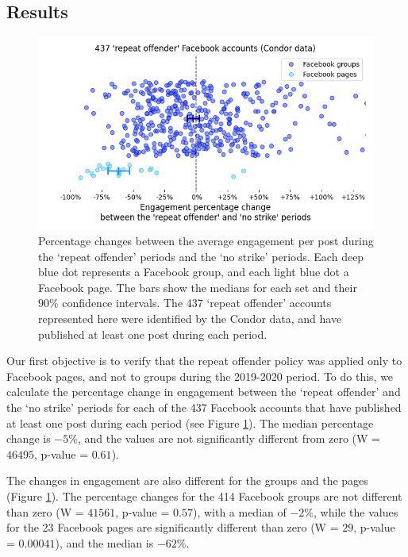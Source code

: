 \documentclass[review]{elsarticle}
\begin{document}
\subsection{Results}

\begin{figure}[!h]
\centering
\includegraphics[scale=0.5]{./../figure/condor_repeat_vs_free_percentage_change.png}
\caption{
Percentage changes between the average engagement per post during the `repeat offender' periods and the `no strike' periods.
Each deep blue dot represents a Facebook group, and each light blue dot a Facebook page.
The bars show the medians for each set and their $90\%$ confidence intervals.
The 437 `repeat offender' accounts represented here were identified by the Condor data, and have published at least one post during each period.
}
\label{condor_repeat_vs_free_percentage_change}
\end{figure}

Our first objective is to verify that the repeat offender policy was applied only to Facebook pages, and not to groups during the 2019-2020 period.
To do this, we calculate the percentage change in engagement between the `repeat offender' and the `no strike' periods for each of the 437 Facebook accounts that have published at least one post during each period (see Figure \ref{condor_repeat_vs_free_percentage_change}). 
The median percentage change is $-5\%$, and the values are not significantly different from zero (W = $46495$, p-value = $0.61$).

The changes in engagement are also different for the groups and the pages (Figure \ref{condor_repeat_vs_free_percentage_change}). 
The percentage changes for the 414 Facebook groups are not different than zero (W = $41561$, p-value = $0.57$), with a median of $-2\%$, while the values for the 23 Facebook pages are significantly different than zero (W = $29$, p-value = $0.00041$), and the median is $-62\%$.
\end{document}
